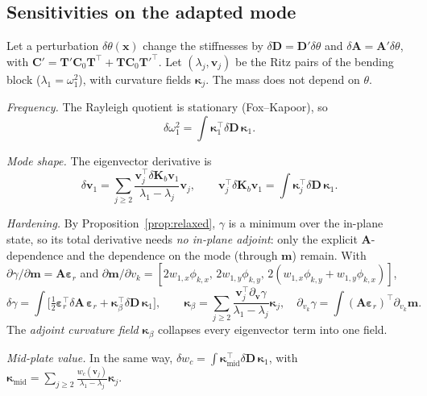 \subsection{Sensitivities on the adapted mode}\label{sec:sens}
Let a perturbation $\delta\theta(\bm x)$ change the stiffnesses by
$\delta\bm D=\bm D'\delta\theta$ and $\delta\bm A=\bm A'\delta\theta$, with
$\bm C'=\bm T'\bm C_0\bm T^{\!\top}+\bm T\bm C_0\bm T'^{\!\top}$. Let
$(\lambda_j,\bm v_j)$ be the Ritz pairs of the bending block ($\lambda_1=\omega_1^2$),
with curvature fields $\bm\kappa_j$. The mass does not depend on $\theta$.

\emph{Frequency.} The Rayleigh quotient is stationary (Fox--Kapoor), so
\begin{equation}
\delta\omega_1^2=\int\bm\kappa_1^{\!\top}\delta\bm D\,\bm\kappa_1 .
\label{eq:dom}
\end{equation}

\emph{Mode shape.} The eigenvector derivative is
\begin{equation}
\delta\bm v_1=\sum_{j\ge2}\frac{\bm v_j^{\!\top}\delta\bm K_b\bm v_1}{\lambda_1-\lambda_j}\bm v_j,
\qquad \bm v_j^{\!\top}\delta\bm K_b\bm v_1=\int\bm\kappa_j^{\!\top}\delta\bm D\,\bm\kappa_1 .
\end{equation}

\emph{Hardening.} By Proposition~\ref{prop:relaxed}, $\gamma$ is a minimum over the
in-plane state, so its total derivative needs \emph{no in-plane adjoint}: only the
explicit $\bm A$-dependence and the dependence on the mode (through $\bm m$) remain.
With $\partial\gamma/\partial\bm m=\bm A\bm\varepsilon_r$ and
$\partial\bm m/\partial v_k=[2w_{1,x}\phi_{k,x},\,2w_{1,y}\phi_{k,y},\,
2(w_{1,x}\phi_{k,y}+w_{1,y}\phi_{k,x})]$,
\begin{equation}
\delta\gamma=\int\Big[\tfrac12\bm\varepsilon_r^{\!\top}\delta\bm A\,\bm\varepsilon_r
+\bm\kappa_\beta^{\!\top}\delta\bm D\,\bm\kappa_1\Big],\qquad
\bm\kappa_\beta=\sum_{j\ge2}\frac{\bm v_j^{\!\top}\partial_{\bm v}\gamma}{\lambda_1-\lambda_j}\bm\kappa_j,\quad
\partial_{v_k}\gamma=\int(\bm A\bm\varepsilon_r)^{\!\top}\partial_{v_k}\bm m .
\label{eq:dgamma}
\end{equation}
The \emph{adjoint curvature field} $\bm\kappa_\beta$ collapses every eigenvector term into
one field.

\emph{Mid-plate value.} In the same way,
$\delta w_c=\int\bm\kappa_{\mathrm{mid}}^{\!\top}\delta\bm D\,\bm\kappa_1$, with
$\bm\kappa_{\mathrm{mid}}=\sum_{j\ge2}\frac{w_c(\bm v_j)}{\lambda_1-\lambda_j}\bm\kappa_j$.

